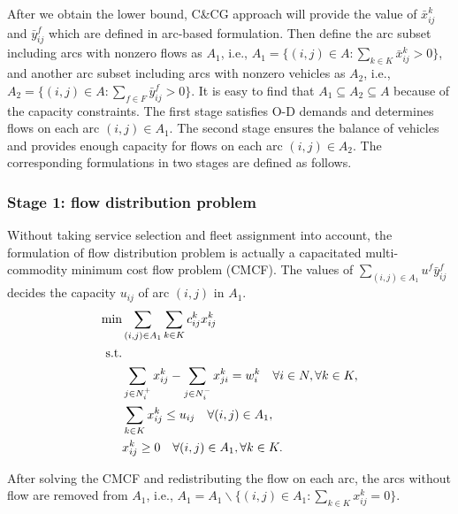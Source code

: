 \documentclass[11pt,nonblindrev,fleqn]{article}
\begin{document}
After we obtain the lower bound, C\&CG approach will provide the value of $\bar{x}_{ij}^k$ and $\bar{y}_{ij}^f$ which are defined in arc-based formulation. Then define the arc subset including arcs with nonzero flows as $A_1$, i.e., $A_1 = \{ (i,j)\in A : \sum_{k\in K} \bar{x}_{ij}^k >0 \} $, and another arc subset including arcs with nonzero vehicles as $A_2$, i.e., $A_2 =\{  (i,j)\in A : \sum_{f\in F} \bar{y}_{ij}^f >0 \}$. It is easy to find that $A_1\subseteq A_2 \subseteq A$ because of the capacity constraints. The first stage satisfies O-D demands and determines flows on each arc $(i,j)\in A_1$. The second stage ensures the balance of vehicles and provides enough capacity for flows on each arc $(i,j)\in A_2$. The corresponding formulations in two stages are defined as follows.

\subsubsection{Stage 1: flow distribution problem}
Without taking service selection and fleet assignment into account, the formulation of flow distribution problem is actually a capacitated multi-commodity minimum cost flow problem (CMCF). The values of $\sum_{(i,j)\in A_1}u^f \bar{y}_{ij}^f $ decides the capacity $u_{ij}$ of arc $(i,j)$ in $A_1$.
\begin{align}
   \min& \sum_{(i,j)\in A_1}\sum_{k\in K} c_{ij}^k x_{ij}^k     \\
   \rm{s.t.} & \nonumber \\
         &  \sum_{j\in N_i^+}x_{ij}^k - \sum_{j\in N_i^-}x_{ji}^k = w_i^k     \quad      \forall i\in N, \forall k\in K,  \\
         &  \sum_{k\in K} x_{ij}^k \leq u_{ij}      \quad    \forall (i,j)\in A_1,  \\
        &  x_{ij}^k \geq 0   \quad    \forall (i,j)\in A_1, \forall k\in K.
\end{align}

After solving the CMCF and redistributing the flow on each arc, the arcs without flow are removed from $A_1$, i.e., $A_1 = A_1 \backslash  \{ (i,j)\in A_1 : \sum_{k\in K} x_{ij}^k =0 \}$.
\end{document}
